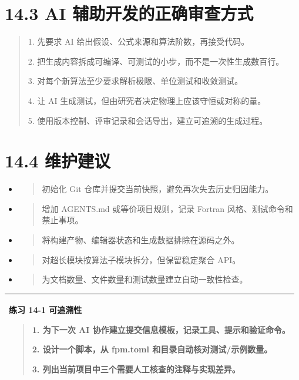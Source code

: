 \documentclass[UTF8,openany,11pt,fontset=fandol]{ctexbook}
\begin{document}
\section{\texorpdfstring{\textbf{14.3 AI
辅助开发的正确审查方式}}{14.3 AI 辅助开发的正确审查方式}}\label{ai-ux8f85ux52a9ux5f00ux53d1ux7684ux6b63ux786eux5ba1ux67e5ux65b9ux5f0f}

\begin{quote}
1. 先要求 AI 给出假设、公式来源和算法阶数，再接受代码。

2. 把生成内容拆成可编译、可测试的小步，而不是一次性生成数百行。

3. 对每个新算法至少要求解析极限、单位测试和收敛测试。

4. 让 AI 生成测试，但由研究者决定物理上应该守恒或对称的量。

5. 使用版本控制、评审记录和会话导出，建立可追溯的生成过程。
\end{quote}

\section{\texorpdfstring{\textbf{14.4
维护建议}}{14.4 维护建议}}\label{ux7ef4ux62a4ux5efaux8bae}

\begin{itemize}
\item
  \begin{quote}
  初始化 Git 仓库并提交当前快照，避免再次失去历史归因能力。
  \end{quote}
\item
  \begin{quote}
  增加 AGENTS.md 或等价项目规则，记录 Fortran 风格、测试命令和禁止事项。
  \end{quote}
\item
  \begin{quote}
  将构建产物、编辑器状态和生成数据排除在源码之外。
  \end{quote}
\item
  \begin{quote}
  对超长模块按算法子模块拆分，但保留稳定聚合 API。
  \end{quote}
\item
  \begin{quote}
  为文档数量、文件数量和测试数量建立自动一致性检查。
  \end{quote}
\end{itemize}

\begin{longtable}[]{@{}l@{}}
\toprule
\endhead
\begin{minipage}[t]{0.97\columnwidth}\raggedright
\textbf{练习 14-1 可追溯性}

\begin{quote}
1. 为下一次 AI 协作建立提交信息模板，记录工具、提示和验证命令。

2. 设计一个脚本，从 fpm.toml 和目录自动核对测试/示例数量。

3. 列出当前项目中三个需要人工核查的注释与实现差异。
\end{quote}\strut
\end{minipage}\tabularnewline
\bottomrule
\end{longtable}
\end{document}
